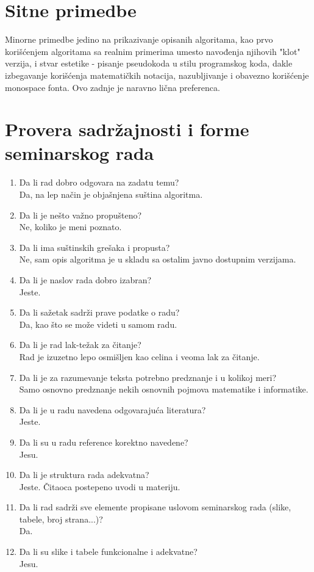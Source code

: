 \documentclass[a4paper]{report}
\begin{document}
\section{Sitne primedbe}
Minorne primedbe jedino na prikazivanje opisanih algoritama, kao prvo korišćenjem algoritama sa realnim primerima umesto navođenja njihovih "klot" verzija, 
i stvar estetike - pisanje pseudokoda u stilu programskog koda, dakle izbegavanje korišćenja matematičkih notacija, nazubljivanje i obavezno korišćenje 
monospace fonta. Ovo zadnje je naravno lična preferenca.


\section{Provera sadržajnosti i forme seminarskog rada}

\begin{enumerate}
\item Da li rad dobro odgovara na zadatu temu?\\ Da, na lep način je objašnjena suština algoritma.
\item Da li je nešto važno propušteno?\\ Ne, koliko je meni poznato.
\item Da li ima suštinskih grešaka i propusta?\\ Ne, sam opis algoritma je u skladu sa ostalim javno dostupnim verzijama.
\item Da li je naslov rada dobro izabran?\\ Jeste.
\item Da li sažetak sadrži prave podatke o radu?\\ Da, kao što se može videti u samom radu.
\item Da li je rad lak-težak za čitanje?\\ Rad je izuzetno lepo osmišljen kao celina i veoma lak za čitanje.
\item Da li je za razumevanje teksta potrebno predznanje i u kolikoj meri?\\ Samo osnovno predznanje nekih osnovnih pojmova matematike i informatike.
\item Da li je u radu navedena odgovarajuća literatura?\\ Jeste.
\item Da li su u radu reference korektno navedene?\\ Jesu.
\item Da li je struktura rada adekvatna?\\ Jeste. Čitaoca postepeno uvodi u materiju.
\item Da li rad sadrži sve elemente propisane uslovom seminarskog rada (slike, tabele, broj strana...)?\\ Da.
\item Da li su slike i tabele funkcionalne i adekvatne?\\ Jesu.
\end{enumerate}
\end{document}
